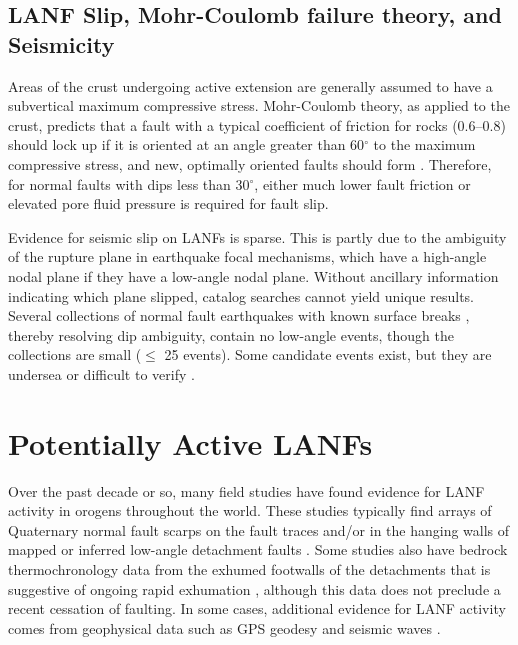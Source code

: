 \documentclass[twocolumn,grl]{AGUTeX}
\begin{document}
\begin{article}
\subsection{LANF Slip, Mohr-Coulomb failure theory, and Seismicity}

Areas of the crust undergoing active extension are generally assumed
to have a subvertical maximum compressive stress.  Mohr-Coulomb
theory, as applied to the crust, predicts that a fault with a typical
coefficient of friction for rocks (0.6--0.8) should lock up if it is
oriented at an angle greater than 60$^\circ$ to the maximum compressive stress,
and new, optimally oriented faults should form \citep{sibson1985}.  Therefore,
for normal faults with dips less than 30$^\circ$, either much lower
fault friction or elevated pore fluid pressure is required for fault slip.

Evidence for seismic slip on LANFs is sparse.  This is partly due to the
ambiguity of the rupture plane in earthquake focal mechanisms, which have a
high-angle nodal plane if they have a low-angle nodal plane.  Without
ancillary information indicating which plane slipped, catalog searches 
cannot yield unique results.  Several collections of normal fault earthquakes
with known surface breaks \citep{jackson1987, collettinisibson2001}, thereby
resolving dip ambiguity, contain no low-angle events, though the collections
are small ($\le$ 25 events).  Some candidate events exist, but they are
undersea \citep[e.g.,][]{abers2001} or difficult to verify \citep[e.g.,]
[]{doser1987ancash}.


\section{Potentially Active LANFs}

Over the past decade or so, many field studies have found evidence for LANF 
activity in orogens throughout the world. These studies typically find arrays of 
Quaternary normal fault scarps on the fault traces and/or in the hanging walls 
of mapped or inferred low-angle detachment faults \citep [e.g.,]
[]{axen1999baja}. Some studies also have bedrock thermochronology data from the 
exhumed footwalls of the detachments that is suggestive of ongoing rapid 
exhumation \citep [e.g.,][]{sundell2013lunggar}, although this data does not 
preclude a recent cessation of faulting. In some cases, additional evidence for 
LANF activity comes from geophysical data such as GPS geodesy \citep [e.g.,]
[]{hreinsdottir2009altotib} and seismic waves \citep [e.g.,][]{doser1987ancash}.


\end{article}
\end{document}
